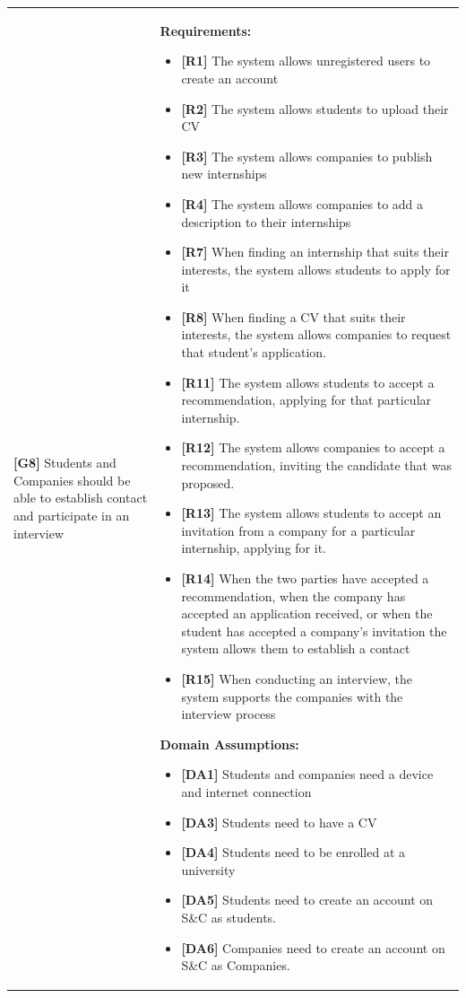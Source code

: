 \begin{longtable}{|p{}|p{}|}
\textbf{[G8]} Students and Companies should be able to establish contact and participate in an interview 
& 
\textbf{Requirements:}
\begin{itemize}
    \item \textbf{[R1]} The system allows unregistered users to create an account
    \item \textbf{[R2]} The system allows students to upload their CV
    \item \textbf{[R3]} The system allows companies to publish new internships
    \item \textbf{[R4]} The system allows companies to add a description to their internships
    \item \textbf{[R7]} When finding an internship that suits their interests, the system allows students to apply for it
    \item \textbf{[R8]} When finding a CV that suits their interests, the system allows companies to request that student's application.
    \item  \textbf{[R11]} The system allows students to accept a recommendation, applying for that particular internship.
    \item  \textbf{[R12]} The system allows companies to accept a recommendation, inviting the candidate that was proposed.
    \item \textbf{[R13]} The system allows students to accept an invitation from a company for a particular internship, applying for it.
    \item \textbf{[R14]} When the two parties have accepted a recommendation, when the company has accepted an application received, or when the student has accepted a company's invitation the system allows them to establish a contact
    \item \textbf{[R15]} When conducting an interview, the system supports the companies with the interview process 
\end{itemize}
\textbf{Domain Assumptions:}
\begin{itemize}
    \item \textbf{[DA1]} Students and companies need a device and internet connection
     \item \textbf{[DA3]} Students need to have a CV
     \item \textbf{[DA4]} Students need to be enrolled at a university
    \item \textbf{[DA5]} Students need to create an account on S\&C as students.
    \item \textbf{[DA6]} Companies need to create an account on S\&C as Companies.

\end{itemize}
\end{longtable}
